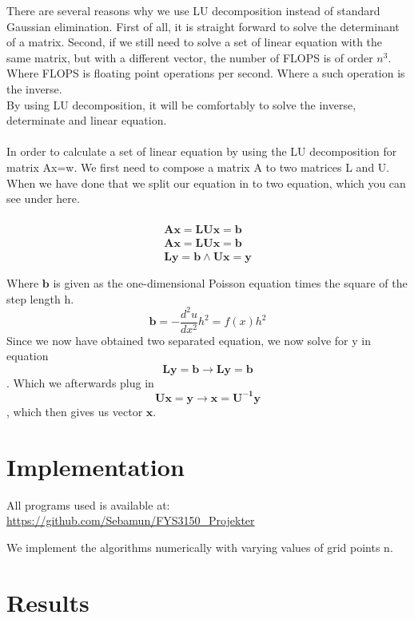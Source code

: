 \documentclass[norsk,a4paper,12pt]{article}
\begin{document}
There are several reasons why we use LU decomposition instead of standard Gaussian elimination. First of all, it is straight forward to solve the determinant of a matrix. Second, if we still need to solve a set of linear equation with the same matrix, but with a different vector, the number of FLOPS is of order $n^3$. Where FLOPS is floating point operations per second. Where a such operation is the inverse. 
\\
By using LU decomposition, it will be comfortably to solve the inverse, determinate and linear equation.         
\\
\\
In order to calculate a set of linear equation by using the LU decomposition for matrix Ax=w. We first need to compose a matrix A to two matrices L and U. When we have done that we split our equation in to two equation, which you can see under here.  
\\
\\
\begin{align*}
\mathbf{A}\mathbf{x}=\mathbf{L}\mathbf{U}\mathbf{x}=\mathbf{b}\\
\mathbf{A}\mathbf{x}=\mathbf{L}\mathbf{U}\mathbf{x}=\mathbf{b}\\
\mathbf{L}\mathbf{y}=\mathbf{b} \land  \mathbf{U}\mathbf{x}=\mathbf{y}\\
\end{align*}
\begin{align*}
\end{align*}
Where $\mathbf{b}$ is given as the one-dimensional Poisson equation times the square of the step length h. $$\mathbf{b}=-\frac{d^2u}{dx^2}h^2=f(x)h^2$$
Since we now have obtained two separated equation, we now solve for y in equation $$\mathbf{L}\mathbf{y}=\mathbf{b} \rightarrow \mathbf{L}\mathbf{y}=\mathbf{b} $$. Which we afterwards plug in  $$\mathbf{U}\mathbf{x}=\mathbf{y} \rightarrow \mathbf{x}=\mathbf{U^{-1}}\mathbf{y}$$, which then gives us vector $\mathbf{x}$.


\section{Implementation}

All programs used is available at: \\
\url{https://github.com/Sebamun/FYS3150_Projekter}

We implement the algorithms numerically with varying values of grid points n. 

\section{Results}
\end{document}
